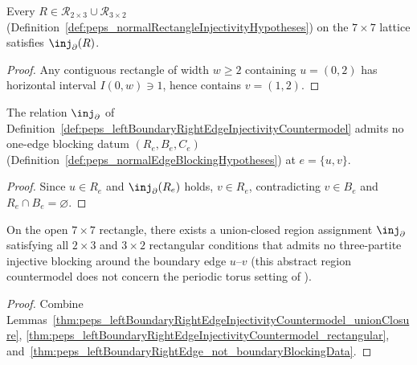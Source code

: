 \begin{lemma}%
    \label{thm:peps_leftBoundaryRightEdgeInjectivityCountermodel_rectangular}
    \leanok
    Every $R\in\mathcal R_{2\times 3}\cup\mathcal R_{3\times 2}$
    (Definition~\ref{def:peps_normalRectangleInjectivityHypotheses}) on the
    $7\times 7$ lattice satisfies $\inj_{\partial}(R)$.
\end{lemma}
\begin{proof}\leanok
    Any contiguous rectangle of width $w\ge 2$ containing $u=(0,2)$ has
    horizontal interval $I(0,w)\ni 1$, hence contains $v=(1,2)$.
\end{proof}

\begin{lemma}%
    \label{thm:peps_leftBoundaryRightEdge_not_boundaryBlockingData}
    \leanok
    The relation $\inj_{\partial}$ of
    Definition~\ref{def:peps_leftBoundaryRightEdgeInjectivityCountermodel}
    admits no one-edge blocking datum $(R_e,B_e,C_e)$
    (Definition~\ref{def:peps_normalEdgeBlockingHypotheses}) at $e=\{u,v\}$.
\end{lemma}
\begin{proof}\leanok
    Since $u\in R_e$ and $\inj_{\partial}(R_e)$ holds, $v\in R_e$, contradicting
    $v\in B_e$ and $R_e\cap B_e=\varnothing$.
\end{proof}

\begin{lemma}%
    \label{thm:peps_rectangularInjectivity_not_boundaryBlockingData}
    \leanok
    On the open $7\times 7$ rectangle, there exists a union-closed region
    assignment $\inj_{\partial}$ satisfying all $2\times 3$ and $3\times 2$
    rectangular conditions that admits no three-partite injective blocking
    around the boundary edge $u$--$v$ (this abstract region countermodel does
    not concern the periodic torus setting of
    \cite[Theorem~3]{Molnar2018NormalPEPS}).
\end{lemma}
\begin{proof}\leanok
    Combine
    Lemmas~\ref{thm:peps_leftBoundaryRightEdgeInjectivityCountermodel_unionClosure},
    \ref{thm:peps_leftBoundaryRightEdgeInjectivityCountermodel_rectangular},
    and~\ref{thm:peps_leftBoundaryRightEdge_not_boundaryBlockingData}.
\end{proof}

